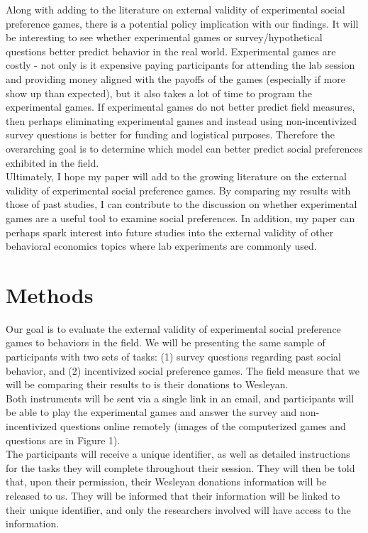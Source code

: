 \documentclass{article}
\begin{document}
Along with adding to the literature on external validity of experimental social preference games, there is a potential policy implication with our findings. It will be interesting to see whether experimental games or survey/hypothetical questions better predict behavior in the real world. Experimental games are costly - not only is it expensive paying participants for attending the lab session and providing money aligned with the payoffs of the games (especially if more show up than expected), but it also takes a lot of time to program the experimental games. If experimental games do not better predict field measures, then perhaps eliminating experimental games and instead using non-incentivized survey questions is better for funding and logistical purposes. Therefore the overarching goal is to determine which model can better predict social preferences exhibited in the field. \\
 
        	Ultimately, I hope my paper will add to the growing literature on the external validity of experimental social preference games. By comparing my results with those of past studies, I can contribute to the discussion on whether experimental games are a useful tool to examine social preferences. In addition, my paper can perhaps spark interest into future studies into the external validity of other behavioral economics topics where lab experiments are commonly used. \\


\section{Methods}

Our goal is to evaluate the external validity of experimental social preference games to behaviors in the field. We will be presenting the same sample of participants with two sets of tasks: (1) survey questions regarding past social behavior, and (2) incentivized social preference games. The field measure that we will be comparing their results to is their donations to Wesleyan. \\
 
Both instruments will be sent via a single link in an email, and participants will be able to play the experimental games and answer the survey and non-incentivized questions online remotely (images of the computerized games and questions are in Figure 1). \\
 
The participants will receive a unique identifier, as well as detailed instructions for the tasks they will complete throughout their session. They will then be told that, upon their permission, their Wesleyan donations information will be released to us. They will be informed that their information will be linked to their unique identifier, and only the researchers involved will have access to the information. \\
\end{document}
